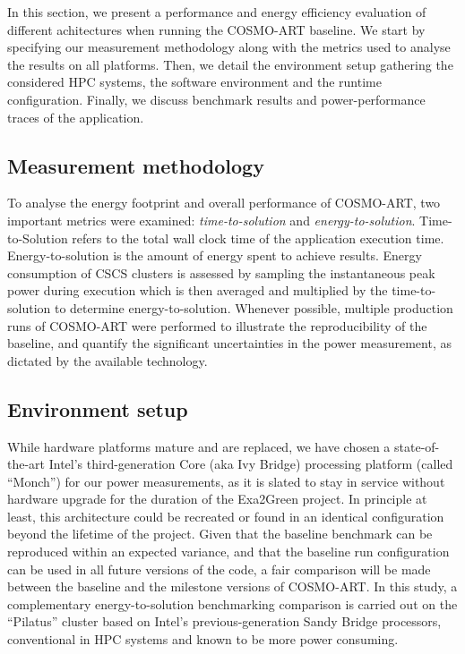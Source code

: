 In  this  section, we  present  a  performance  and energy  efficiency
evaluation  of  different  achitectures  when  running  the  COSMO-ART
baseline.  We  start by  specifying our measurement  methodology along
with the metrics used to  analyse the results on all platforms.  Then,
we detail the environment  setup gathering the considered HPC systems,
the software  environment and the runtime  configuration.  Finally, we
discuss  benchmark   results  and  power-performance   traces  of  the
application.

\subsection{Measurement methodology}
\label{subsec:4.1}
To analyse the energy  footprint and overall performance of COSMO-ART,
two  important metrics  were  examined: \textit{time-to-solution}  and
\textit{energy-to-solution}.   Time-to-Solution  refers  to the  total
wall clock time of  the application execution time. Energy-to-solution
is the amount  of energy spent to achieve  results. Energy consumption
of CSCS clusters is assessed  by sampling the instantaneous peak power
during  execution  which  is  then  averaged  and  multiplied  by  the
time-to-solution  to determine energy-to-solution.  Whenever possible,
multiple production runs of COSMO-ART were performed to illustrate the
reproducibility  of   the  baseline,  and   quantify  the  significant
uncertainties in  the power measurement, as dictated  by the available
technology.

\subsection{Environment setup}
\label{subsec:4.2}
While hardware  platforms mature  and are replaced,  we have  chosen a
state-of-the-art  Intel's  third-generation   Core  (aka  Ivy  Bridge)
processing platform (called ``Monch'')  for our power measurements, as
it  is slated  to stay  in service  without hardware  upgrade  for the
duration  of  the Exa2Green  project.   In  principle  at least,  this
architecture could be recreated or found in an identical configuration
beyond the lifetime of the project.  Given that the baseline benchmark
can be reproduced  within an expected variance, and  that the baseline
run configuration  can be used in  all future versions of  the code, a
fair comparison  will be made  between the baseline and  the milestone
versions   of    COSMO-ART.    In   this    study,   a   complementary
energy-to-solution  benchmarking  comparison  is  carried out  on  the
``Pilatus'' cluster based  on Intel's previous-generation Sandy Bridge
processors, conventional  in HPC  systems and known  to be  more power
consuming.

